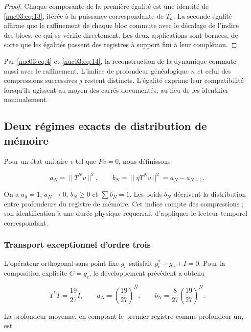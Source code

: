 \begin{proof}
Chaque composante de la première égalité est une identité de \eqref{nuc03:eq:13}, itérée à la puissance correspondante de \(T_n\). La seconde égalité affirme que le raffinement de chaque bloc commute avec le décalage de l’indice des blocs, ce qui se vérifie directement. Les deux applications sont bornées, de sorte que les égalités passent des registres à support fini à leur complétion.
\end{proof}

Par \eqref{nuc03:eq:4} et \eqref{nuc03:eq:14}, la reconstruction de la dynamique commute aussi avec le raffinement. L’indice de profondeur généalogique \(n\) et celui des compressions successives \(j\) restent distincts. L’égalité exprime leur compatibilité lorsqu’ils agissent au moyen des carrés documentés, au lieu de les identifier nominalement.

\subsection{Deux régimes exacts de distribution de mémoire
}

Pour un état unitaire \(v\) tel que \(Pv=0\), nous définissons


\begin{equation}
a_N=\|T^Nv\|^2,\qquad b_N=\|\eta T^Nv\|^2=a_N-a_{N+1}.
\label{nuc03:eq:15}
\end{equation}

On a \(a_0=1\), \(a_N\to0\), \(b_N\geq0\) et \(\sum b_N=1\). Les poids \(b_N\) décrivent la distribution entre profondeurs du registre de mémoire. Cet indice compte des compressions ; son identification à une durée physique requerrait d’appliquer le lecteur temporel correspondant.


\subsubsection{Transport exceptionnel d’ordre trois}

L’opérateur orthogonal sans point fixe \(g_c\) satisfait \(g_c^2+g_c+I=0\). Pour la composition explicite \(C=g_c\), le développement précédent a obtenu

\begin{equation}
T^*T=\frac{19}{27}I,
\qquad a_N=\left(\frac{19}{27}\right)^N,
\qquad b_N=\frac8{27}\left(\frac{19}{27}\right)^N.
\label{nuc03:eq:16}
\end{equation}

La profondeur moyenne, en comptant le premier registre comme profondeur un, est

